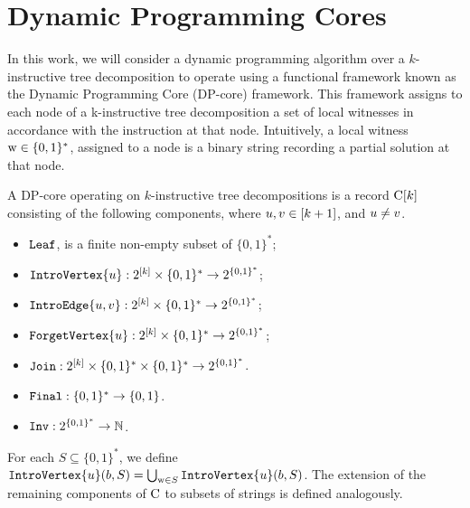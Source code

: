 \section{Dynamic Programming Cores}\label{DPcores}

In this work, we will consider a dynamic programming algorithm over a $k$-instructive tree decomposition to operate using a functional framework known as the Dynamic Programming Core (DP-core) \cite{Baste2022,From2023} framework. 
This framework assigns to each node of a k-instructive tree decomposition a set of local witnesses in accordance with the instruction at that node. Intuitively, a local witness $\mathrm{w} \in \{0,1\}^*$, assigned to a node is a binary string recording a partial solution at that node.

A DP-core operating on $k$-instructive tree decompositions is a record $\mathrm{C}[k]$ consisting of the following components, where $u,v \in [k+1]$, and 
$u\neq v$. 


\begin{itemize}
    \item $\texttt{Leaf}$, is a finite non-empty subset of ${\{0,1\}^*}$;
    \item $\texttt{IntroVertex}\{u\}:2^{[k]}\times \{0,1\}^*\rightarrow 2^{\{0,1\}^*}$;
    \item $\texttt{IntroEdge}\{u,v\}:2^{[k]}\times\{0,1\}^*\rightarrow 2^{\{0,1\}^*}$;
    \item $\texttt{ForgetVertex}\{u\}:2^{[k]}\times \{0,1\}^*\rightarrow 2^{\{0,1\}^*}$;
    \item $\texttt{Join}:2^{[k]}\times \{0,1\}^*\times \{0,1\}^*\rightarrow 2^{\{0,1\}^*}$.
    \item $\texttt{Final}:\{0,1\}^*\rightarrow \{0,1\}$. 
    \item $\texttt{Inv}:2^{\{0,1\}^*}\rightarrow \mathbb{N}$. 
\end{itemize}
%

For each $S\subseteq \{0,1\}^*$, we define $\texttt{IntroVertex}\{u\}(b,S) = \bigcup_{\mathrm{w}\in S} \texttt{IntroVertex}\{u\}(b,S)$. 
The extension of the remaining components of $\mathrm{C}$ to subsets of strings is defined analogously. 



